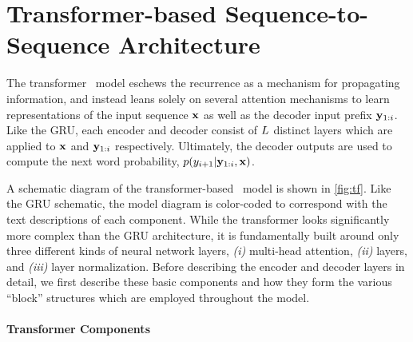 
\chapter{Transformer-based Sequence-to-Sequence Architecture}
\label{sec:nlgtf}



The transformer \sequencetosequence~model eschews the recurrence as a mechanism
for propagating information, and instead leans solely on several 
attention mechanisms to learn representations of the input sequence $\mathbf{x}$
as well as the decoder input prefix $\mathbf{y}_{1:i}$. Like the GRU,
each encoder and decoder consist of $L$ distinct
layers which are applied to $\mathbf{x}$ and $\mathbf{y}_{1:i}$ respectively.
Ultimately,
the decoder outputs are used to compute the next word probability,
$p(y_{i+1}|\mathbf{y}_{1:i},\mathbf{x})$. 

A schematic diagram of the transformer-based \sequencetosequence~model
is shown in \autoref{fig:tf}. Like the GRU schematic, the model diagram is 
color-coded to correspond with the text descriptions of each component.
While the transformer looks significantly more complex than the 
GRU architecture, it is fundamentally built around only three 
different kinds of 
neural network layers, \textit{(i)} multi-head attention, 
\textit{(ii)} \feedforward layers, and \textit{(iii)} 
layer normalization. Before describing the encoder and decoder layers
in detail, we first describe these basic components and how they form 
the various ``block'' structures which are employed throughout the model.

\subsubsection{Transformer Components}

